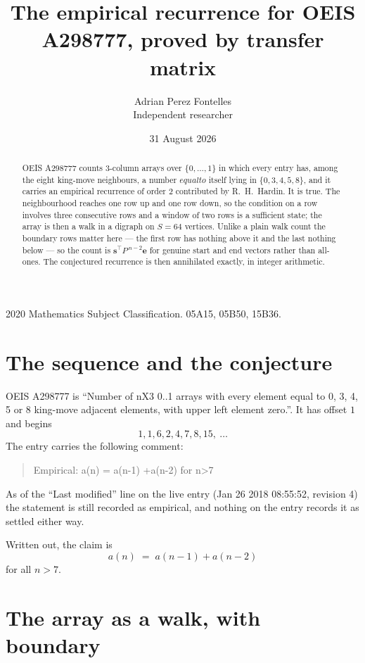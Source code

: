 \documentclass[11pt,a4paper]{article}
\title{The empirical recurrence for OEIS A298777, proved by transfer matrix}
\author{Adrian Perez Fontelles\\ \small Independent researcher}
\date{31 August 2026}
\theoremstyle{plain}
\theoremstyle{definition}
\begin{document}
\maketitle

\begin{abstract}
OEIS A298777 counts $3$-column arrays over $\{0,\dots,1\}$ in which every entry has,
among the eight king-move neighbours, a number $equal to$ itself lying in $\{0,3,4,5,8\}$, and it carries an empirical
recurrence of order $2$ contributed by R.~H.~Hardin. It is true. The neighbourhood
reaches one row up and one row down, so the condition on a row involves three consecutive
rows and a window of two rows is a sufficient state; the array is then a walk in a digraph
on $S=64$ vertices. Unlike a plain walk count the boundary rows matter here --- the first
row has nothing above it and the last nothing below --- so the count is
$\mathbf{s}^{\!\top}P^{\,n-2}\mathbf{e}$ for genuine start and end vectors rather than
all-ones. The conjectured recurrence is then annihilated exactly, in integer arithmetic.
\end{abstract}

\noindent\small 2020 Mathematics Subject Classification. 05A15, 05B50, 15B36.\normalsize

\section{The sequence and the conjecture}

OEIS A298777 is ``Number of nX3 0..1 arrays with every element equal to 0, 3, 4, 5 or 8 king-move adjacent elements, with upper left element zero.''. It has offset
$1$ and begins
\[
1, 1, 6, 2, 4, 7, 8, 15,\ \dots
\]
The entry carries the following comment:
\begin{quote}\small
Empirical: a(n) = a(n-1) +a(n-2) for n>7
\end{quote}
As of the ``Last modified'' line on the live entry (Jan 26 2018 08:55:52, revision
4) the statement is still recorded as empirical, and nothing on the entry
records it as settled either way.

Written out, the claim is
\begin{equation}\label{eq:conj}
a(n)\;=\;a(n-1) + a(n-2)
\end{equation}
for all $n>7$.

\section{The array as a walk, with boundary}
\end{document}
